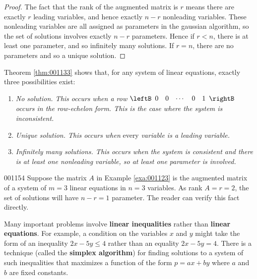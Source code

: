 \begin{proof}
The fact that the rank of the augmented matrix is $r$ means there are exactly $r$ leading variables, and hence exactly $n - r$ nonleading variables. These nonleading variables are all assigned as parameters in the gaussian algorithm, so the set of solutions involves exactly $n - r$ parameters. Hence if $r < n$, there is at least one parameter, and so infinitely many solutions. If $r = n$, there are no parameters and so a unique solution.
\end{proof}

Theorem \ref{thm:001133} shows that, for any system of linear equations, exactly three possibilities exist:

\begin{enumerate}\raggedright
\item \textit{No solution. This occurs when a row} $\leftB \begin{array}{ccccc} 0 & 0 & \cdots & 0 & 1 \end{array} \rightB$ \textit{occurs in the row-echelon form. This is the case where the system is inconsistent.}

\item \textit{Unique solution. This occurs when} every \textit{variable is a leading variable.}

\item \textit{Infinitely many solutions. This occurs when the system is consistent and there is at least one nonleading variable, so at least one parameter is involved.}

\end{enumerate}

\begin{example}{}{001154}
Suppose the matrix $A$ in Example \ref{exa:001123} is the augmented matrix of a system of $m = 3$ linear equations in $n = 3$ variables. As rank $A = r = 2$, the set of solutions will have $n - r = 1$ parameter. The reader can verify this fact directly.
\end{example}

Many important problems involve \textbf{linear inequalities} rather than \textbf{linear equations}. For example, a condition on the variables $x$ and $y$ might take the form of an inequality $2x - 5y \leq 4$ rather than an equality $2x - 5y = 4$. There is a technique (called the \textbf{simplex algorithm}) for finding solutions to a system of such inequalities that maximizes a function of the form $p = ax + by$ where $a$ and $b$ are fixed constants. 

